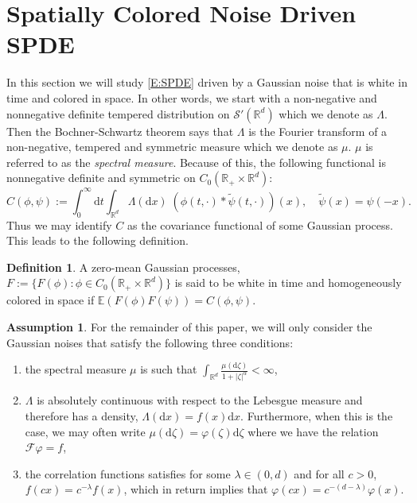 \documentclass[a4paper,11pt]{article}
\numberwithin{equation}{section}
\theoremstyle{plain}
\theoremstyle{definition}
\newtheorem{definition}[theorem]{Definition}
\newtheorem{assumption}[theorem]{Assumption}
\newcommand{\ud}{\ensuremath{\mathrm{d} }}
\newcommand{\R}{\mathbb{R}}
\numberwithin{NQ}{section}
\numberwithin{LQ}{section}
\numberwithin{ZQ}{section}
\begin{document}
	\section{Spatially Colored Noise Driven SPDE}
In this section we will study \eqref{E:SPDE} driven by a Gaussian noise that is white in time and colored in space. In other words, we start with a non-negative and nonnegative definite tempered distribution on $\mathscr{S}'(\R^d)$ which we denote as $\Lambda$. Then the Bochner-Schwartz theorem says that $\Lambda$ is the Fourier transform of a non-negative, tempered and symmetric measure which we denote as $\mu$. $\mu$ is referred to as the {\it spectral measure}. Because of this, the following functional is nonnegative definite and symmetric on $C_0(\R_+ \times \R^d)$:
	\begin{equation}
	\label{E:CovNoise}
		C(\phi, \psi) := \int_0^\infty \ud t \int_{\R^{d}}  \Lambda(\ud x) \; (\phi(t,\cdot)*\tilde{\psi}(t,\cdot))(x), \quad \tilde{\psi}(x) = \psi(-x).
	\end{equation}
Thus we may identify $C$ as the covariance functional of some Gaussian process. This leads to the following definition.
	\begin{definition}
A zero-mean Gaussian processes, $F := \{ F(\phi) : \phi \in C_0(\R_+ \times \R^d) \}$ is said to be white in time and homogeneously colored in space if $\mathbb{E}(F(\phi)F(\psi)) = C(\phi,\psi)$. 
	\end{definition}

	\begin{assumption}
	\label{A:NoiseAssum1}
For the remainder of this paper, we will only consider the Gaussian noises that satisfy the following three conditions:
		\begin{enumerate}
			\item the spectral measure $\mu$ is such that $\int_{\R^d} \frac{\mu(\ud \zeta)}{1 + |\zeta|^\alpha} < \infty$,
			\item $\Lambda$ is absolutely continuous with respect to the Lebesgue measure and therefore has a density, $\Lambda(\ud x) = f(x) \ud x$. Furthermore, when this is the case, we may often write $\mu(\ud \zeta) = \varphi(\zeta) \ud \zeta$ where we have the relation $\mathcal{F}\varphi = f$,
			\item the correlation functions satisfies for some $\lambda \in (0,d)$ and for all $c>0$, $f(cx) = c^{-\lambda}f(x)$, which in return implies that $\varphi(cx) = c^{-(d- \lambda)}\varphi(x)$.
		\end{enumerate}
	\end{assumption}
\end{document}
